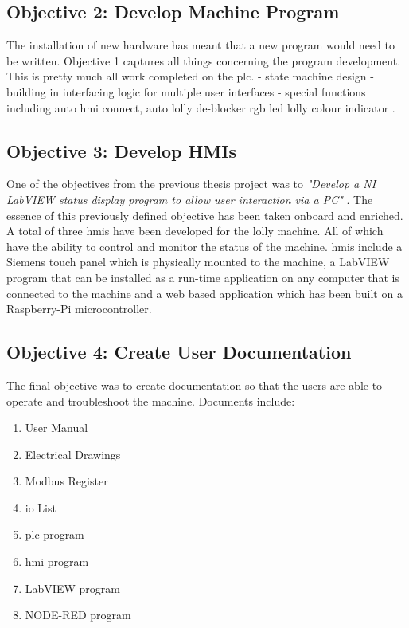     \subsection{Objective 2: Develop Machine Program}
        The installation of new hardware has meant that a new program would need to be written. Objective 1 captures all things concerning the program development. This is pretty much all work completed on the \acrshort{plc}.
        - state machine design
        - building in interfacing logic for multiple user interfaces
        - special functions including auto \acrshort{hmi} connect, auto lolly de-blocker \acrshort{rgb} \acrshort{led} lolly colour indicator .

        
        
    \subsection{Objective 3: Develop HMIs}
        
        One of the objectives from the previous thesis project was to \textit{"Develop a NI LabVIEW status display program to allow user interaction via a PC"} \cite{thesisJodie}. The essence of this previously defined objective has been taken onboard and enriched. A total of three \acrshort{hmi}s have been developed for the lolly machine. All of which have the ability to control and monitor the status of the machine. \acrshort{hmi}s include a Siemens touch panel which is physically mounted to the machine, a LabVIEW program that can be installed as a run-time application on any computer that is connected to the machine and a web based application which has been built on a Raspberry-Pi microcontroller.
        
    \subsection{Objective 4: Create User Documentation}
        The final objective was to create documentation so that the users are able to operate and troubleshoot the machine. Documents include:

        \begin{enumerate}
            \item   User Manual
            \item   Electrical Drawings
            \item   Modbus Register
            \item   \acrshort{io} List
            \item   \acrshort{plc} program
            \item   \acrshort{hmi} program
            \item   LabVIEW program
            \item   NODE-RED program
        \end{enumerate}
        
